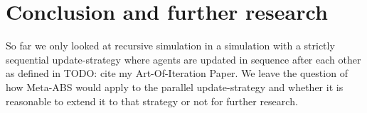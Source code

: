 \section{Conclusion and further research}

So far we only looked at recursive simulation in a simulation with a strictly sequential update-strategy where agents are updated in sequence after each other as defined in TODO: cite my Art-Of-Iteration Paper. We leave the question of how Meta-ABS would apply to the parallel update-strategy and whether it is reasonable to extend it to that strategy or not for further research.